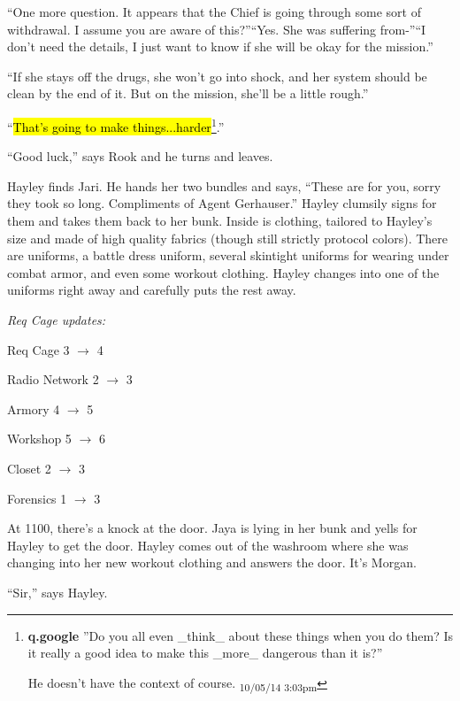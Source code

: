 ``One more question.  It appears that the Chief is going through some sort of withdrawal.  I assume you are aware of this?''``Yes. She was suffering from-''``I don't need the details, I just want to know if she will be okay for the mission.''

``If she stays off the drugs, she won't go into shock, and her system should be clean by the end of it.  But on the mission, she'll be a little rough.''

``\hl{That's going to make things...harder}\footnote{\textbf{q.google }''Do you all even \_think\_ about these things when you do them?  Is it really a good idea to make this \_more\_ dangerous than it is?''

He doesn't have the context of course. \textsubscript{10/05/14 3:03pm}}.''

``Good luck,'' says Rook and he turns and leaves.





Hayley finds Jari.  He hands her two bundles and says, ``These are for you, sorry they took so long.  Compliments of Agent Gerhauser.''  Hayley clumsily signs for them and takes them back to her bunk.  Inside is clothing, tailored to Hayley's size and made of high quality fabrics (though still strictly protocol colors).  There are uniforms, a battle dress uniform, several skintight uniforms for wearing under combat armor, and even some workout clothing.  Hayley changes into one of the uniforms right away and carefully puts the rest away.



\textit{Req Cage updates:}

Req Cage 3 $\rightarrow$ 4

Radio Network 2 $\rightarrow$  3

Armory 4 $\rightarrow$  5

Workshop 5 $\rightarrow$  6

Closet 2 $\rightarrow$  3

Forensics 1 $\rightarrow$  3





At 1100, there's a knock at the door.  Jaya is lying in her bunk and yells for Hayley to get the door.  Hayley comes out of the washroom where she was changing into her new workout clothing and answers the door.  It's Morgan.

``Sir,'' says Hayley.

